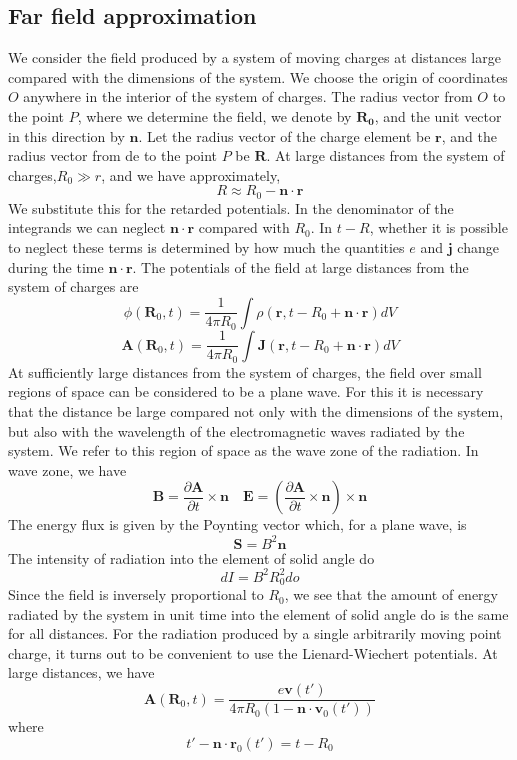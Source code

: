 \subsection{Far field approximation}
We consider the field produced by a system of moving charges at distances large compared with the dimensions of the system. We choose the origin of coordinates $O$ anywhere in the interior of the system of charges. The radius vector from $O$ to the point $P$, where we determine the field, we denote by $\bm{R_0}$, and the unit vector in this direction by $\bm{n}$. Let the radius vector of the charge element be $\bm{r}$, and the radius vector from de to the point $P$ be $\bm{R}$. At large distances from the system of charges,$R_0 \gg r$, and we have approximately,
\[R \approx R_0 - \bm{n}\cdot\bm{r}\]
We substitute this for the retarded potentials. In the denominator of the integrands we can neglect $\bm{n}\cdot\bm{r}$ compared with $R_0$. In $t-R$, whether it is possible to neglect these terms is determined by how much the quantities $e$ and $\bm{j}$ change during the time $\bm{n}\cdot\bm{r}$. The potentials of the field at large distances from the system of charges are
\[\phi(\bm{R}_0,t) = \frac{1}{4\pi R_0} \int \rho(\bm{r},t-R_0+\bm{n}\cdot\bm{r}) dV\]
\[\bm{A}(\bm{R}_0,t) = \frac{1}{4\pi R_0} \int \bm{J}(\bm{r},t-R_0+\bm{n}\cdot\bm{r}) dV\]
At sufficiently large distances from the system of charges, the field over small regions of space can be considered to be a plane wave. 
For this it is necessary that the distance be large
compared not only with the dimensions of the system, but also with the wavelength of the electromagnetic waves radiated by the system. 
We refer to this region of space as the wave
zone of the radiation.
In wave zone, we have
\[\bm{B} = \frac{\partial \bm{A}}{\partial t} \times \bm{n} \quad \bm{E} = \left(\frac{\partial \bm{A}}{\partial t} \times \bm{n}\right) \times \bm{n}\]
The energy flux is given by the Poynting vector which, for a plane wave, is
\[\bm{S} = B^2\bm{n}\]
The intensity of radiation into the element of solid angle do
\[dI = B^2R_0^2 do\]
Since the field is inversely proportional to $R_0$, we see that the amount of energy radiated by the system in unit time into the element of solid angle do is the same for all distances.
For the radiation produced by a single arbitrarily moving point charge, it turns out to be convenient to use the Lienard-Wiechert potentials. At large distances, we have
\[\bm{A}(\bm{R}_0,t) = \frac{e\bm{v}(t')}{4\pi R_0 (1 - \bm{n}\cdot\bm{v}_0(t'))}\]
where
\[ t'-\bm{n}\cdot\bm{r}_0(t') = t - R_0\]
\\
